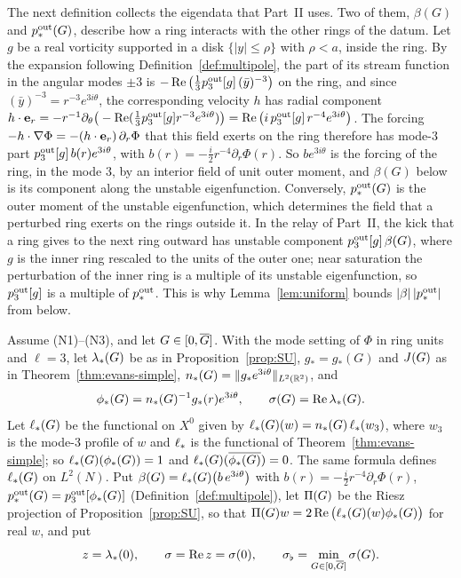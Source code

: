 The next definition collects the eigendata that Part~II uses. Two of them, $\beta(G)$
and $p^{\mathrm{out}}_*(G)$, describe how a ring interacts with the other rings of the datum.
Let $g$ be a real vorticity supported in a disk $\{|y|\le\rho\}$ with $\rho<a$, inside
the ring. By the expansion following Definition~\ref{def:multipole}, the part of its
stream function in the angular modes $\pm3$ is
$-\Re\big(\frac13p^{\mathrm{out}}_3[g]\,(\bar y)^{-3}\big)$ on the ring, and since
$(\bar y)^{-3}=r^{-3}e^{3i\theta}$, the corresponding velocity $h$ has radial
component $h\cdot\textbf{e}_r=-r^{-1}\partial_\theta\big(-\Re(\frac13p^{\mathrm{out}}_3[g]r^{-3}e^{3i\theta})\big)
=\Re\big(i\,p^{\mathrm{out}}_3[g]\,r^{-4}e^{3i\theta}\big)$. The forcing
$-h\cdot\nabla\Phi=-(h\cdot\textbf{e}_r)\,\partial_r\Phi$ that this field exerts on the ring
therefore has mode-$3$ part $p^{\mathrm{out}}_3[g]\,b(r)e^{3i\theta}$, with
$b(r)=-\frac i2r^{-4}\partial_r\Phi(r)$. So $be^{3i\theta}$ is the forcing of the ring,
in the mode $3$, by an interior field of unit outer moment, and $\beta(G)$ below is
its component along the unstable eigenfunction. Conversely, $p^{\mathrm{out}}_*(G)$ is the outer
moment of the unstable eigenfunction, which determines the field that a perturbed
ring exerts on the rings outside it. In the relay of Part~II, the kick that a ring
gives to the next ring outward has unstable component $p^{\mathrm{out}}_3[g]\,\beta(G)$, where
$g$ is the inner ring rescaled to the units of the outer one; near saturation the
perturbation of the inner ring is a multiple of its unstable eigenfunction, so
$p^{\mathrm{out}}_3[g]$ is a multiple of $p^{\mathrm{out}}_*$. This is why Lemma~\ref{lem:uniform} bounds
$|\beta|\,|p^{\mathrm{out}}_*|$ from below.

\begin{definition}
\label{def:eigendata}
Assume \textup{(N1)}--\textup{(N3)}, and let $G\in[0,\overline{G}]$. With the mode
setting of $\Phi$ in ring units and $\ell=3$, let $\lambda_*(G)$ be as in
Proposition~\ref{prop:SU}, $g_*=g_*(G)$ and $J(G)$ as in
Theorem~\ref{thm:evans-simple}, $n_*(G)=\|g_*e^{3i\theta}\|_{L^2(\mathbb{R}^2)}$, and
\[
\phi_*(G)=n_*(G)^{-1}g_*(r)e^{3i\theta},\qquad \sigma(G)=\Re\lambda_*(G).
\]
Let $\ell_*(G)$ be the functional on $X^0$ given by
$\ell_*(G)(w)=n_*(G)\,\ell_*(w_3)$, where $w_3$ is the mode-$3$ profile of $w$
and $\ell_*$ is the functional of Theorem~\ref{thm:evans-simple}; so
$\ell_*(G)(\phi_*(G))=1$ and $\ell_*(G)(\overline{\phi_*(G)})=0$. The same
formula defines $\ell_*(G)$ on $L^2(N)$. Put
$\beta(G)=\ell_*(G)\big(b\,e^{3i\theta}\big)$ with $b(r)=-\frac i2r^{-4}\partial_r\Phi(r)$,
$p^{\mathrm{out}}_*(G)=p^{\mathrm{out}}_3[\phi_*(G)]$ (Definition~\ref{def:multipole}), let $\Pi(G)$ be the Riesz projection of
Proposition~\ref{prop:SU}, so that $\Pi(G)w=2\Re\big(\ell_*(G)(w)\phi_*(G)\big)$
for real $w$, and put
\[
z=\lambda_*(0),\qquad \sigma=\Re z=\sigma(0),\qquad \sigma_\flat=\min_{G\in[0,\overline{G}]}\sigma(G).
\]
\end{definition}

